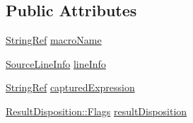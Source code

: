 \subsection*{Public Attributes}
\begin{DoxyCompactItemize}
\item 
\hyperlink{class_catch_1_1_string_ref}{String\-Ref} \hyperlink{struct_catch_1_1_assertion_info_aaf3fbb9f1fe09c879ba3d877584e3056}{macro\-Name}
\item 
\hyperlink{struct_catch_1_1_source_line_info}{Source\-Line\-Info} \hyperlink{struct_catch_1_1_assertion_info_a17bdbb404ba12658034f833be2f4c3e7}{line\-Info}
\item 
\hyperlink{class_catch_1_1_string_ref}{String\-Ref} \hyperlink{struct_catch_1_1_assertion_info_accd36744b4acaa3a691a72df0b42190f}{captured\-Expression}
\item 
\hyperlink{struct_catch_1_1_result_disposition_a3396cad6e2259af326b3aae93e23e9d8}{Result\-Disposition\-::\-Flags} \hyperlink{struct_catch_1_1_assertion_info_a60353b3632ab2f827162f2b2d6911073}{result\-Disposition}
\end{DoxyCompactItemize}


